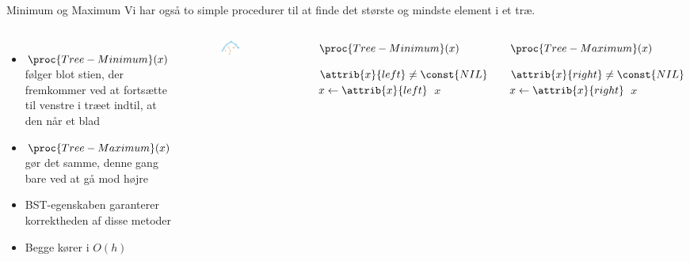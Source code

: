 \documentclass[aspectratio=1610]{beamer}
\begin{document}
\begin{frame}{Minimum og Maximum}{}
    Vi har også to simple procedurer til at finde det største og mindste element
    i et træ.

    \begin{columns}
        \begin{itemize}[<+(1)->]
            \small
            \item $\proc{Tree-Minimum}(x)$ følger blot stien, der fremkommer ved
                at fortsætte til venstre i træet indtil, at den når et blad
            \item $\proc{Tree-Maximum}(x)$ gør det samme, denne gang bare ved at
                gå mod højre
            \item BST-egenskaben garanterer korrektheden af disse metoder
            \item Begge kører i $O(h)$
        \end{itemize}

        \begin{figure}[h]
            \centering
            \includegraphics[width=0.4\textwidth]{bst/tree-min-max}
        \end{figure}
    
        \small
        \begin{block}{$\proc{Tree-Minimum}(x)$}
            
            \vspace{-\abovedisplayskip}
            \begin{codebox}
                \li \While $\attrib{x}{left}\neq \const{NIL}$ \Do
                \li $x \gets \attrib{x}{left}$ 
                \End
                \li \Return $x$
            \end{codebox}
        \end{block}
        \vfill
        \begin{block}{$\proc{Tree-Maximum}(x)$}
            
            \vspace{-\abovedisplayskip}
            \begin{codebox}
                \li \While $\attrib{x}{right}\neq \const{NIL}$ \Do
                \li $x \gets \attrib{x}{right}$ 
                \End
                \li \Return $x$
            \end{codebox}
        \end{block}
    \end{columns}
\end{frame}
\end{document}
